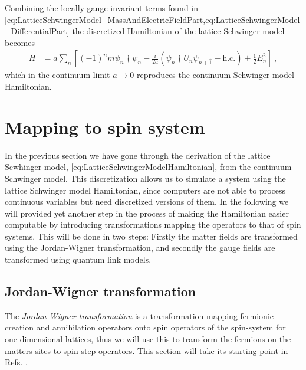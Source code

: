 \documentclass[../main.tex]{subfiles} %
\begin{document}
Combining the locally gauge invariant terms found in \cref{eq:LatticeSchwingerModel_MassAndElectricFieldPart,eq:LatticeSchwingerModel_DifferentialPart} the discretized Hamiltonian of the lattice Schwinger model becomes
\begin{align} \label{eq:LatticeSchwingerModelHamiltonian}
    H &= a \sum_n \left[ (-1)^n m \psi_n\dagger \psi_n - \frac{i}{2a}\left(\psi_n\dagger U_n\psi_{n+\hat{1}} - \mathrm{h.c.}\right) + \frac{1}{2}E_n^2 \right] \: ,
\end{align}
which in the continuum limit $a \rightarrow 0$ reproduces the continuum Schwinger model Hamiltonian.




\section{Mapping to spin system} \label{sec:MappingToSpinSystem}

In the previous section we have gone through the derivation of the lattice Scwhinger model, \cref{eq:LatticeSchwingerModelHamiltonian}, from the continuum Schwinger model. This discretization allows us to simulate a system using the lattice Schwinger model Hamiltonian, since computers are not able to process continuous variables but need discretized versions of them. In the following we will provided yet another step in the process of making the Hamiltonian easier computable by introducing transformations mapping the operators to that of spin systems. This will be done in two steps: Firstly the matter fields are transformed using the Jordan-Wigner transformation, and secondly the gauge fields are transformed using quantum link models.



\subsection{Jordan-Wigner transformation} \label{sec:Jordan-WignerTransformation}

The \emph{Jordan-Wigner transformation} is a transformation mapping fermionic creation and annihilation operators onto spin operators of the spin-\half system for one-dimensional lattices, thus we will use this to transform the fermions on the matters sites to spin step operators. This section will take its starting point in Refs. \cite{jordan-wigner_1928, banksSusskindKogut_StrongCoupling_1976, panyella_masterThesis_2019}.
\end{document}
